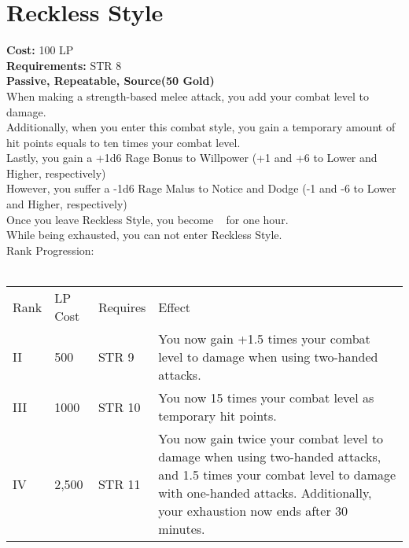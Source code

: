 \section{Reckless Style}\label{perk:recklessStyle}
\textbf{Cost:} 100 LP\\
\textbf{Requirements:} STR 8\\
\textbf{Passive, Repeatable, Source(50 Gold)}\\
When making a strength-based melee attack, you add your combat level to damage.\\
Additionally, when you enter this combat style, you gain a temporary amount of hit points equals to ten times your combat level.\\
Lastly, you gain a +1d6 Rage Bonus to Willpower (+1 and +6 to Lower and Higher, respectively)\\
However, you suffer a -1d6 Rage Malus to Notice and Dodge (-1 and -6 to Lower and Higher, respectively)\\
Once you leave Reckless Style, you become ~ for one hour.\\
While being exhausted, you can not enter Reckless Style.\\
Rank Progression:\\
\\
\begin{tabular}{l | l | l | l}
    Rank & LP Cost & Requires & Effect\\
    II & 500 & STR 9 & You now gain +1.5 times your combat level to damage when using two-handed attacks.\\
    III & 1000 & STR 10 & You now 15 times your combat level as temporary hit points.\\
    IV & 2,500 & STR 11 & You now gain twice your combat level to damage when using two-handed attacks, and 1.5 times your combat level to damage with one-handed attacks.
    Additionally, your exhaustion now ends after 30 minutes.\\
\end{tabular}